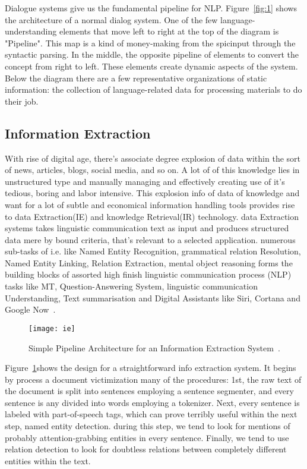 Dialogue systems give us the fundamental pipeline for NLP. Figure~\ref{fig:1} 
shows the architecture of a normal dialog system. One of the few language-understanding elements that move left to right at the top of the diagram is "Pipeline". This map is a kind of money-making from the spicinput through the syntactic parsing. In the middle, the opposite pipeline of elements to convert the concept from right to left. These elements create dynamic aspects of the system. Below the diagram there are a few representative organizations of static information: the collection of language-related data for processing materials to do their job.

\subsection{Information Extraction}
With rise of digital age, there's associate degree explosion of data within the sort of news, articles, blogs, social media, and so on. A lot of of this knowledge lies in unstructured type and manually managing and effectively creating use of it's tedious, boring and labor intensive. This explosion info of data of knowledge and want for a lot of subtle and economical information handling tools provides rise to data Extraction(IE) and knowledge Retrieval(IR) technology. data Extraction systems takes linguistic communication text as input and produces structured data mere by bound criteria, that's relevant to a selected application. numerous sub-tasks of i.e. like Named Entity Recognition, grammatical relation Resolution, Named Entity Linking, Relation Extraction, mental object reasoning forms the building blocks of assorted high finish linguistic communication process (NLP) tasks like MT, Question-Answering System, linguistic communication Understanding, Text summarisation and Digital Assistants like Siri, Cortana and Google Now~\cite{DBLP:journals/corr/abs-1807-02383}.
\begin{figure}[htbp]
    \centering
    \texttt{[image: ie]}
    \caption{Simple Pipeline Architecture for an Information Extraction System~\cite{DBLP:journals/corr/abs-1807-02383}.}
    \label{fig:2}
\end{figure}

Figure~\ref{fig:2}shows the design for a straightforward info extraction system. It begins by process a document victimization many of the procedures: 1st, the raw text of the document is split into sentences employing a sentence segmenter, and every sentence is any divided into words employing a tokenizer. Next, every sentence is labeled with part-of-speech tags, which can prove terribly useful within the next step, named entity detection. during this step, we tend to look for mentions of probably attention-grabbing entities in every sentence. Finally, we tend to use relation detection to look for doubtless relations between completely different entities within the text.
